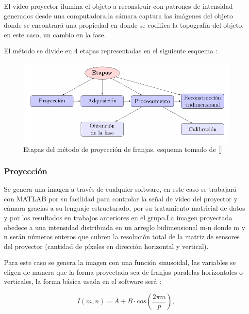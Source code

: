 \documentclass[UTF8]{article}
\begin{document}
El video proyector ilumina el objeto a reconstruir con patrones de intensidad generados desde una computadora,la cámara captura las imágenes del objeto donde se encontrará una propiedad en donde se codifica la topografía del objeto, en este caso, un cambio en la fase.
\medskip


El método se divide en 4 etapas representadas en el siguiente esquema :

\begin{figure}[h!]
\includegraphics[width=12cm]{Esquema1.png}
\centering
\caption{Etapas del método de proyección de franjas, esquema tomado de []}
\label{im2}
\end{figure}


\subsubsection{Proyección}

Se genera una imagen a través de cualquier software, en este caso se trabajará con MATLAB por su facilidad para controlar la señal de video del proyector y cámara gracias a su lenguaje estructurado, por su tratamiento matricial de datos y por los resultados en trabajos anteriores en el grupo.La imagen proyectada obedece a una intensidad distribuida en un arreglo bidimensional m$\cdot$n donde m y n serán números enteros que cubren la resolución total de la matriz de sensores del proyector (cantidad de píxeles en dirección horizontal y vertical).
\medskip


Para este caso se genera la imagen con una función sinusoidal, las variables se eligen de manera que la forma proyectada sea de franjas paralelas horizontales o verticales, la forma básica usada en el software será :

\begin{equation}
    I(m,n) = A + B\cdot cos  \left( \frac{2\pi m}{p}\right),
    \label{eq1}
\end{equation}
\end{document}
